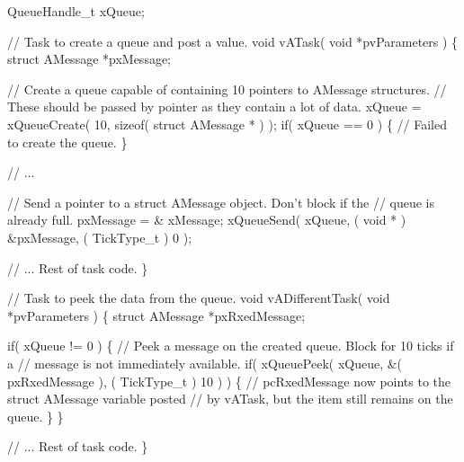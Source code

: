 \begin{DoxyPre}QueueHandle\_t xQueue;\end{DoxyPre}



\begin{DoxyPre}// Task to create a queue and post a value.
void vATask( void *pvParameters )
\{
struct AMessage *pxMessage;\end{DoxyPre}



\begin{DoxyPre}   // Create a queue capable of containing 10 pointers to AMessage structures.
   // These should be passed by pointer as they contain a lot of data.
   xQueue = xQueueCreate( 10, sizeof( struct AMessage * ) );
   if( xQueue == 0 )
   \{
    // Failed to create the queue.
   \}\end{DoxyPre}



\begin{DoxyPre}   // ...\end{DoxyPre}



\begin{DoxyPre}   // Send a pointer to a struct AMessage object.  Don't block if the
   // queue is already full.
   pxMessage = \& xMessage;
   xQueueSend( xQueue, ( void * ) \&pxMessage, ( TickType\_t ) 0 );\end{DoxyPre}



\begin{DoxyPre}   // ... Rest of task code.
\}\end{DoxyPre}



\begin{DoxyPre}// Task to peek the data from the queue.
void vADifferentTask( void *pvParameters )
\{
struct AMessage *pxRxedMessage;\end{DoxyPre}



\begin{DoxyPre}   if( xQueue != 0 )
   \{
    // Peek a message on the created queue.  Block for 10 ticks if a
    // message is not immediately available.
    if( xQueuePeek( xQueue, \&( pxRxedMessage ), ( TickType\_t ) 10 ) )
    \{
        // pcRxedMessage now points to the struct AMessage variable posted
        // by vATask, but the item still remains on the queue.
    \}
   \}\end{DoxyPre}



\begin{DoxyPre}   // ... Rest of task code.
\}
\end{DoxyPre}
 
